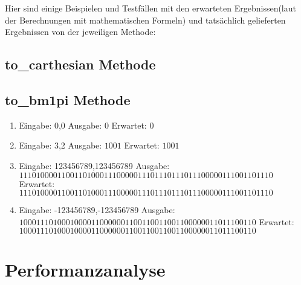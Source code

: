 \documentclass[course=erap]{aspdoc}
\begin{document}
Hier sind einige Beispielen und Testfällen mit den erwarteten Ergebnissen(laut der Berechnungen mit mathematischen Formeln) und tatsächlich gelieferten Ergebnissen von der jeweiligen Methode:
\subsection{to\_carthesian Methode}


\subsection{to\_bm1pi Methode}
\begin{enumerate}[label=\roman*)]
\item Eingabe: 0,0 \quad  Ausgabe: $0$ \quad Erwartet: $0$
\item Eingabe: 3,2 \quad Ausgabe: $1001$ \quad Erwartet: $1001$
\item Eingabe: 123456789,123456789 \newline Ausgabe: $111010000110011010001110000011101110111011100000111001101110
$ \newline Erwartet: $111010000110011010001110000011101110111011100000111001101110
$
\item Eingabe: -123456789,-123456789 \newline Ausgabe: $10001110100010000110000001100110011001100000011011100110
$ \newline Erwartet: 
$10001110100010000110000001100110011001100000011011100110
$
\end{enumerate}
\section{Performanzanalyse}
\end{document}
